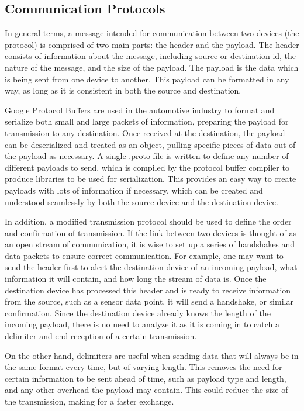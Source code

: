 \subsection*{Communication Protocols}
In general terms, a message intended for communication between two devices (the protocol) is comprised of two main parts: the header and the payload. The header consists of information about the message, including source or destination id, the nature of the message, and the size of the payload. The payload is the data which is being sent from one device to another. This payload can be formatted in any way, as long as it is consistent in both the source and destination.

Google Protocol Buffers \cite{Google:2014} are used in the automotive industry to format and serialize both small and large packets of information, preparing the payload for transmission to any destination. Once received at the destination, the payload can be deserialized and treated as an object, pulling specific pieces of data out of the payload as necessary. A single .proto file is written to define any number of different payloads to send, which is compiled by the protocol buffer compiler to produce libraries to be used for serialization. This provides an easy way to create payloads with lots of information if necessary, which can be created and understood seamlessly by both the source device and the destination device.

In addition, a modified transmission protocol \cite{NSI:2014} should be used to define the order and confirmation of transmission. If the link between two devices is thought of as an open stream of communication, it is wise to set up a series of handshakes and data packets to ensure correct communication. For example, one may want to send the header first to alert the destination device of an incoming payload, what information it will contain, and how long the stream of data is. Once the destination device has processed this header and is ready to receive information from the source, such as a sensor data point, it will send a handshake, or similar confirmation. Since the destination device already knows the length of the incoming payload, there is no need to analyze it as it is coming in to catch a delimiter and end reception of a certain transmission.

On the other hand, delimiters are useful when sending data that will always be in the same format every time, but of varying length. This removes the need for certain information to be sent ahead of time, such as payload type and length, and any other overhead the payload may contain. This could reduce the size of the transmission, making for a faster exchange.






